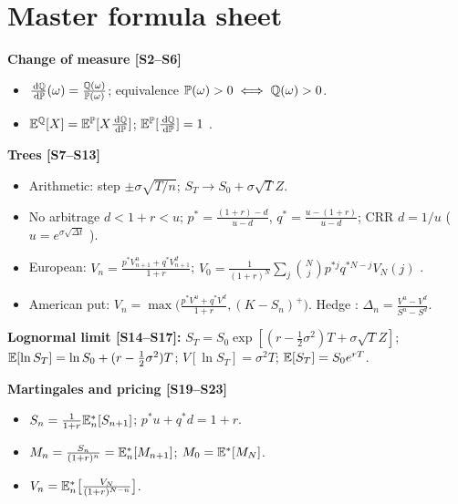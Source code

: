 \documentclass[10pt]{article}
\begin{document}
\section{Master formula sheet}
\textbf{Change of measure [S2--S6]}
\begin{itemize}
\item $\frac{\,\mathrm{d}\mathbb{Q}}{\,\mathrm{d}\mathbb{P}}(\omega)=\frac{\mathbb{Q}(\omega)}{\mathbb{P}(\omega)}$; equivalence $\mathbb{P}(\omega)>0\iff\mathbb{Q}(\omega)>0$.
\item $\mathbb{E}^{\mathbb{Q}}[X]=\mathbb{E}^{\mathbb{P}}[X\frac{\,\mathrm{d}\mathbb{Q}}{\,\mathrm{d}\mathbb{P}}]$; $\mathbb{E}^{\mathbb{P}}[\frac{\,\mathrm{d}\mathbb{Q}}{\,\mathrm{d}\mathbb{P}}]=1$ \beyond.
\end{itemize}
\textbf{Trees [S7--S13]}
\begin{itemize}
\item Arithmetic: step $\pm\sigma\sqrt{T/n}$; $S_T\to S_0+\sigma\sqrt TZ$.
\item No arbitrage $d<1+r<u$; $p^*=\frac{(1+r)-d}{u-d}$, $q^*=\frac{u-(1+r)}{u-d}$; CRR $d=1/u$ ($u=e^{\sigma\sqrt{\Delta t}}$ \beyond).
\item European: $V_n=\frac{p^*V^u_{n+1}+q^*V^d_{n+1}}{1+r}$; $V_0=\frac{1}{(1+r)^N}\sum_j\binom Nj p^{*j}q^{*N-j}V_N(j)$ \beyond.
\item American put: $V_n=\max\big(\frac{p^*V^u+q^*V^d}{1+r},(K-S_n)^+\big)$. Hedge \beyond: $\Delta_n=\frac{V^u-V^d}{S^u-S^d}$.
\end{itemize}
\textbf{Lognormal limit [S14--S17]:} $S_T=S_0\exp[(r-\frac12\sigma^2)T+\sigma\sqrt TZ]$; $\mathbb{E}[\ln S_T]=\ln S_0+(r-\frac12\sigma^2)T$; $V[\ln S_T]=\sigma^2T$; $\mathbb{E}[S_T]=S_0e^{rT}$.

\textbf{Martingales and pricing [S19--S23]}
\begin{itemize}
\item $S_n=\frac{1}{1+r}\mathbb{E}^*_n[S_{n+1}]$; $p^*u+q^*d=1+r$.
\item $M_n=\frac{S_n}{(1+r)^n}=\mathbb{E}^*_n[M_{n+1}]$; $M_0=\mathbb{E}^*[M_N]$.
\item $V_n=\mathbb{E}^*_n\big[\frac{V_N}{(1+r)^{N-n}}\big]$.
\end{itemize}
\end{document}

